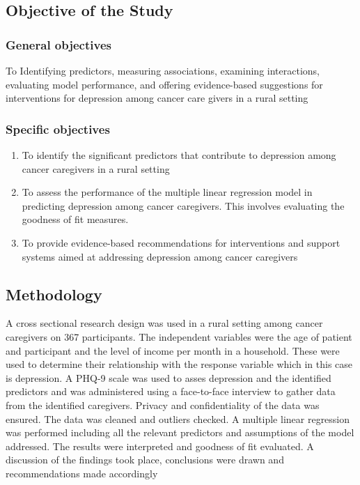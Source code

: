 \documentclass[12pt]{article}
\numberwithin{equation}{section}
\begin{document}
\subsection{Objective of the Study}
\subsubsection{General objectives}
To Identifying predictors, measuring associations, examining interactions, evaluating model performance, and offering evidence-based suggestions for interventions for depression among cancer care givers in a rural setting
\subsubsection{Specific objectives}
\begin{enumerate}
\item To identify the significant predictors that contribute to depression among cancer caregivers in a rural setting
\item To assess the performance of the multiple linear regression model in predicting depression among cancer caregivers. This involves evaluating the goodness of fit measures.
\item To provide evidence-based recommendations for interventions and support systems aimed at addressing depression among cancer caregivers
\end{enumerate}

\subsection{Methodology}
A cross sectional research design was used in a rural setting among cancer caregivers on 367 participants. The independent variables were the age of patient and participant and the level of income per month in a household. These were used to determine their relationship with the response variable which in this case is depression. A PHQ-9 scale was used to asses depression and the identified predictors and was administered using a face-to-face interview to gather data from the identified caregivers. Privacy and confidentiality of the data was ensured. The data was cleaned and outliers checked. A multiple linear regression was performed including all the relevant predictors and assumptions of the model addressed. The results were interpreted and goodness of fit evaluated. A discussion of the findings took place, conclusions were drawn and recommendations made accordingly
\end{document}
